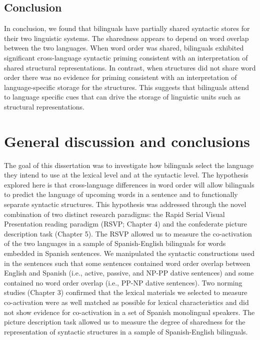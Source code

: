 \section{Conclusion}
\label{conclusion}

In conclusion, we found that bilinguals have partially shared syntactic stores for their two linguistic systems. The sharedness appears to depend on word overlap between the two languages. When word order was shared, bilinguals exhibited significant cross-language syntactic priming consistent with an interpretation of shared structural representations. In contrast, when structures did not share word order there was no evidence for priming consistent with an interpretation of language-specific storage for the structures. This suggests that bilinguals attend to language specific cues that can drive the storage of linguistic units such as structural representations. 




\chapter{General discussion and conclusions}
\label{generaldiscussionandconclusions}

The goal of this dissertation was to investigate how bilinguals select the language they intend to use at the lexical level and at the syntactic level. The hypothesis explored here is that cross-language differences in word order will allow bilinguals to predict the language of upcoming words in a sentence and to functionally separate syntactic structures. This hypothesis was addressed through the novel combination of two distinct research paradigms: the Rapid Serial Visual Presentation reading paradigm (RSVP; Chapter 4) and the confederate picture description task (Chapter 5). The RSVP allowed us to measure the co-activation of the two languages in a sample of Spanish-English bilinguals for words embedded in Spanish sentences. We manipulated the syntactic constructions used in the sentences such that some sentences contained word order overlap between English and Spanish (i.e., active, passive, and NP-PP dative sentences) and some contained no word order overlap (i.e., PP-NP dative sentences). Two norming studies (Chapter 3) confirmed that the lexical materials we selected to measure co-activation were as well matched as possible for lexical characteristics and did not show evidence for co-activation in a set of Spanish monolingual speakers. The picture description task allowed us to measure the degree of sharedness for the representation of syntactic structures in a sample of Spanish-English bilinguals. 


